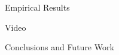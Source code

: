     \begin{frame}[fragile]{Empirical Results}
    \end{frame}

    \begin{frame}[fragile]{Video}
    \end{frame}

    \begin{frame}[fragile]{Conclusions and Future Work}
    \end{frame}






